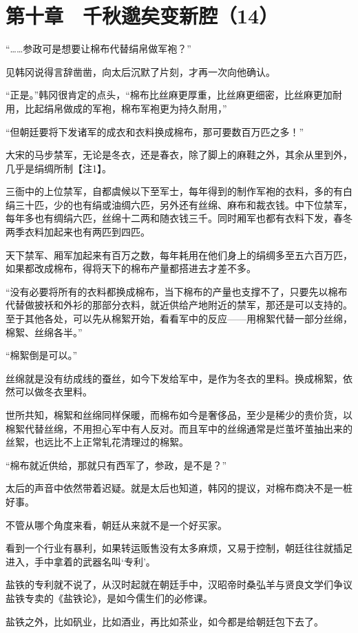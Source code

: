 \section{第十章　千秋邈矣变新腔（14）}

“……参政可是想要让棉布代替绢帛做军袍？”

见韩冈说得言辞凿凿，向太后沉默了片刻，才再一次向他确认。

“正是。”韩冈很肯定的点头，“棉布比丝麻更厚重，比丝麻更细密，比丝麻更加耐用，比起绢帛做成的军袍，棉布军袍更为持久耐用，”

“但朝廷要将下发诸军的成衣和衣料换成棉布，那可要数百万匹之多！”

大宋的马步禁军，无论是冬衣，还是春衣，除了脚上的麻鞋之外，其余从里到外，几乎是绢绸所制【注1】。

三衙中的上位禁军，自都虞候以下至军士，每年得到的制作军袍的衣料，多的有白绢三十匹，少的也有绢或油绸六匹，另外还有丝绵、麻布和裁衣钱。中下位禁军，每年多也有绸绢六匹，丝绵十二两和随衣钱三千。同时厢军也都有衣料下发，春冬两季衣料加起来也有两匹到四匹。

天下禁军、厢军加起来有百万之数，每年耗用在他们身上的绢绸多至五六百万匹，如果都改成棉布，得将天下的棉布产量都搭进去才差不多。

“没有必要将所有的衣料都换成棉布，当下棉布的产量也支撑不了，只要先以棉布代替做披袄和外衫的那部分衣料，就近供给产地附近的禁军，那还是可以支持的。至于其他各处，可以先从棉絮开始，看看军中的反应——用棉絮代替一部分丝绵，棉絮、丝绵各半。”

“棉絮倒是可以。”

丝绵就是没有纺成线的蚕丝，如今下发给军中，是作为冬衣的里料。换成棉絮，依然可以做冬衣里料。

世所共知，棉絮和丝绵同样保暖，而棉布如今是奢侈品，至少是稀少的贵价货，以棉絮代替丝绵，不用担心军中有人反对。而且军中的丝绵通常是烂茧坏茧抽出来的丝絮，也远比不上正常轧花清理过的棉絮。

“棉布就近供给，那就只有西军了，参政，是不是？”

太后的声音中依然带着迟疑。就是太后也知道，韩冈的提议，对棉布商决不是一桩好事。

不管从哪个角度来看，朝廷从来就不是一个好买家。

看到一个行业有暴利，如果转运贩售没有太多麻烦，又易于控制，朝廷往往就插足进入，手中拿着的武器名叫‘专利’。

盐铁的专利就不说了，从汉时起就在朝廷手中，汉昭帝时桑弘羊与贤良文学们争议盐铁专卖的《盐铁论》，是如今儒生们的必修课。

盐铁之外，比如矾业，比如酒业，再比如茶业，如今都是给朝廷包下去了。


